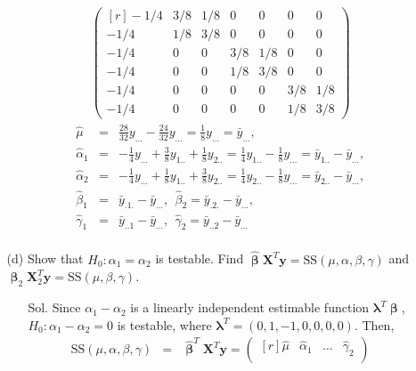 \documentclass[12pt]{article} %
\begin{document}
\begin{enumerate}
\begin{itemize}
\begin{itemize}
\begin{eqnarray*}
\begin{pmatrix}[r]
			   -1/4 &  3/8 &  1/8 &    0 &    0 &    0 & 0 \\
			   -1/4 &  1/8 &  3/8 &    0 &    0 &    0 & 0 \\
			   -1/4 &    0 &    0 &  3/8 &  1/8 &    0 & 0 \\
			   -1/4 &    0 &    0 &  1/8 &  3/8 &    0 & 0 \\
			   -1/4 &    0 &    0 &    0 &    0 &  3/8 & 1/8 \\
			   -1/4 &    0 &    0 &    0 &    0 &  1/8 & 3/8
			 \end{pmatrix}		    
		    \end{eqnarray*}
		    \begin{eqnarray*}
		     \hat{\mu}&=&\frac{28}{32}y_{...}-\frac{24}{32}y_{...}=\frac{1}{8}y_{...}=\bar{y}_{...},\\
		     \hat{\alpha}_{1}&=&-\frac{1}{4}y_{...}+\frac{3}{8}y_{1..}+\frac{1}{8}y_{2..}
		     =\frac{1}{4}y_{1..}-\frac{1}{8}y_{...}=\bar{y}_{1..}-\bar{y}_{...},\\
		     \hat{\alpha}_{2}&=&-\frac{1}{4}y_{...}+\frac{1}{8}y_{1..}+\frac{3}{8}y_{2..}
		     =\frac{1}{4}y_{2..}-\frac{1}{8}y_{...}=\bar{y}_{2..}-\bar{y}_{...},\\
		     \hat{\beta}_{1}&=&\bar{y}_{.1.}-\bar{y}_{...},
		     ~~\hat{\beta}_{2}=\bar{y}_{.2.}-\bar{y}_{...},\\
		     \hat{\gamma}_{1}&=&\bar{y}_{..1}-\bar{y}_{...},
		     ~~\hat{\gamma}_{2}=\bar{y}_{..2}-\bar{y}_{...}\\		    		     
		    \end{eqnarray*}
   		  \end{itemize}	    	    
	   \item[(d)] Show that $H_{0}:\alpha_{1}=\alpha_{2}$ is testable. 
	   Find $\hat{\pmb{\upbeta}}\mathbf{X}^{T}\mathbf{y}=\mathrm{SS}(\mu,\alpha,\beta,\gamma)$ and 
	   $\hat{\pmb{\upbeta}}_{2}\mathbf{X}^{T}_{2}\mathbf{y}=\mathrm{SS}(\mu,\beta,\gamma)$.
	      \begin{itemize}
		    \item[Sol.] Since $\alpha_{1}-\alpha_{2}$ is a linearly independent estimable function 
		    $\pmb{\lambda}^{T}\pmb{\upbeta}$, $H_{0}:\alpha_{1}-\alpha_{2}=0$ is testable, 
		    where $\pmb{\lambda}^{T}=(0,1,-1,0,0,0,0)$. Then,
		    \begin{eqnarray*}
		     \mathrm{SS}(\mu,\alpha,\beta,\gamma)&=&\hat{\pmb{\upbeta}}^{T}\mathbf{X}^{T}\mathbf{y}=
		     \begin{pmatrix}[r]
		     \hat{\mu} & \hat{\alpha}_{1} &\ldots &\hat{\gamma}_{2}\\

\end{pmatrix}
\end{eqnarray*}
\end{itemize}
\end{itemize}
\end{enumerate}
\end{document}
